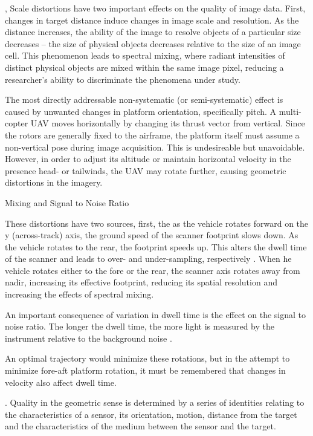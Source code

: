 \documentclass[10pt]{article}
\begin{document}
, Scale distortions have two important effects on the quality of image data. First, changes in target distance induce changes in image scale and resolution. As the distance increases, the ability of the image to resolve objects of a particular size decreases -- the size of physical objects decreases relative to the size of an image cell. This phenomenon leads to spectral mixing, where radiant intensities of distinct physical objects are mixed within the same image pixel, reducing a researcher's ability to discriminate the phenomena under study.

The most directly addressable non-systematic (or semi-systematic) effect is caused by unwanted changes in platform orientation, specifically pitch. A multi-copter UAV moves horizontally by changing its thrust vector from vertical. Since the rotors are generally fixed to the airframe, the platform itself must assume a non-vertical pose during image acquisition. This is undesireable but unavoidable. However, in order to adjust its altitude or maintain horizontal velocity in the presence head- or tailwinds, the UAV may rotate further, causing geometric distortions in the imagery. 

Mixing and Signal to Noise Ratio

These distortions have two sources, first, the as the vehicle rotates forward on the y (across-track) axis, the ground speed of the scanner footprint slows down. As the vehicle rotates to the rear, the footprint speeds up. This alters the dwell time of the scanner and leads to over- and under-sampling, respectively \cite{Gupta2018}. When he vehicle rotates either to the fore or the rear, the scanner axis rotates away from nadir, increasing its effective footprint, reducing its spatial resolution \cite{Gupta2018} and increasing the effects of spectral mixing. 

An important consequence of variation in dwell time is the effect on the signal to noise ratio. The longer the dwell time, the more light is measured by the instrument relative to the background noise \cite{Rogass2014}.

An optimal trajectory would minimize these rotations, but in the attempt to minimize fore-aft platform rotation, it must be remembered that changes in velocity also affect dwell time.




 \cite{Gupta2018}. 
Quality in the geometric sense is determined by a series of identities relating to the characteristics of a sensor, its orientation, motion, distance from the target and the characteristics of the medium between the sensor and the target.
\end{document}
